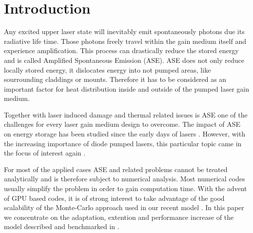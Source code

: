 \section{Introduction}

Any excited upper laser state will inevitably emit spontaneously photons due
its radiative life time. Those photons freely travel within the gain medium
itself and experience amplification. This process can drastically reduce the
stored energy and is called Amplified Spontaneous Emission (ASE). ASE does not
only reduce locally stored energy, it dislocates energy into not pumped areas,
like sourrounding claddings or mounts. Therefore it has to be considered as an
important factor for heat distribution inside and outside of the pumped laser
gain medium.

Together with laser induced damage and thermal related issues is ASE one of the
challenges for every laser gain medium design to overcome. The impact of ASE on
energy storage has been studied since the early days of lasers \cite{Intro1,Intro2,Intro3}.
However, with the increasing importance of diode pumped lasers, this particular
topic came in the focus of interest again \cite{Intro4}.

For most of the applied cases ASE and related problems cannot be treated
analytically and is therefore subject to numerical analysis. Most numerical
codes usually simplify the problem in order to gain computation time. With the
advent of GPU based codes, it is of strong interest to take advantage of the
good scalability of the Monte-Carlo approach used in our recent model \cite{Intro4}.
In this paper we concentrate on the adaptation, extention and performance
increase of the model described and benchmarked in \cite{Intro4}.
